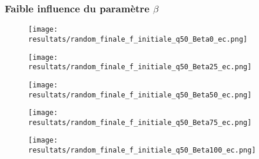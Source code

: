 \documentclass{beamer}
\begin{document}
\begin{frame}
  \frametitle{Faible influence du paramètre $\beta$}
   {
  \begin{figure}[H]
  \begin{center}
    \texttt{[image: resultats/random\_finale\_f\_initiale\_q50\_Beta0\_ec.png]}
  \end{center}
  \end{figure}
  }
   {
  \begin{figure}[H]
  \begin{center}
    \texttt{[image: resultats/random\_finale\_f\_initiale\_q50\_Beta25\_ec.png]}
  \end{center}
  \end{figure}
  }
   {
  \begin{figure}[H]
  \begin{center}
    \texttt{[image: resultats/random\_finale\_f\_initiale\_q50\_Beta50\_ec.png]}
  \end{center}
  \end{figure}
  }
   {
  \begin{figure}[H]
  \begin{center}
    \texttt{[image: resultats/random\_finale\_f\_initiale\_q50\_Beta75\_ec.png]}
  \end{center}
  \end{figure}
  }
   {
  \begin{figure}[H]
  \begin{center}
    \texttt{[image: resultats/random\_finale\_f\_initiale\_q50\_Beta100\_ec.png]}
  \end{center}
  \end{figure}
  }
\end{frame}
\end{document}
